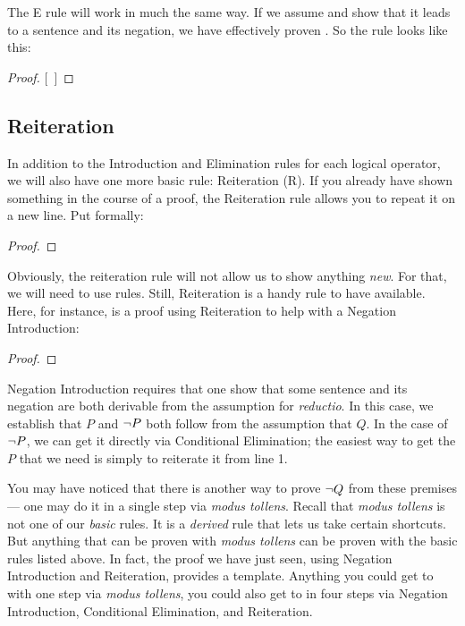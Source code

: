 The {\enot}E rule will work in much the same way. If we assume \enot\metaA{} and show that it leads to a sentence and its negation, we have effectively proven \metaA{}. So the rule looks like this:

\begin{proof}
\open
	\metaB{}
\close
{}[\ ]\metaA{}
\end{proof}

\subsection{Reiteration}
\label{sec:reiteration}

In addition to the Introduction and Elimination rules for each logical operator, we will also have one more basic rule: Reiteration (R). If you already have shown something in the course of a proof, the Reiteration rule allows you to repeat it on a new line. Put formally:

\begin{proof}
	\metaA{}
	\metaA{} 
\end{proof}

Obviously, the reiteration rule will not allow us to show anything \emph{new}. For that, we will need to use rules. Still, Reiteration is a handy rule to have available. Here, for instance, is a proof using Reiteration to help with a Negation Introduction:

\begin{proof}
	 
	\open
		 
	\close
\end{proof}

Negation Introduction requires that one show that some sentence and its negation are both derivable from the assumption for \emph{reductio}. In this case, we establish that $P$ and $\neg P$ both follow from the assumption that $Q$. In the case of $\neg P$, we can get it directly via Conditional Elimination; the easiest way to get the $P$ that we need is simply to reiterate it from line 1.

You may have noticed that there is another way to prove $\neg Q$ from these premises --- one may do it in a single step via \emph{modus tollens}. Recall that \emph{modus tollens} is not one of our \emph{basic} rules. It is a \emph{derived} rule that lets us take certain shortcuts. But anything that can be proven with \emph{modus tollens} can be proven with the basic rules listed above. In fact, the proof we have just seen, using Negation Introduction and Reiteration, provides a template. Anything you could get to with one step via \emph{modus tollens}, you could also get to in four steps via Negation Introduction, Conditional Elimination, and Reiteration.

